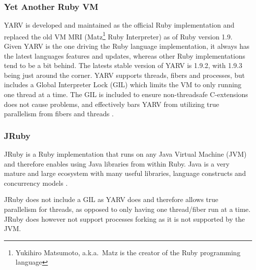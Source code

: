 \subsubsection{Yet Another Ruby VM}
YARV is developed and maintained as the official Ruby implementation and replaced
the old VM MRI (Matz\footnote{Yukihiro Matsumoto, a.k.a.\ Matz is the creator of 
the Ruby programming language} Ruby Interpreter) as of Ruby version 1.9. Given
YARV is the one driving the Ruby language implementation, it always has the
latest languages features and updates, whereas other Ruby implementations tend
to be a bit behind. The latests stable version of YARV is 1.9.2, with 1.9.3
being just around the corner. YARV supports threads, fibers and processes, but
includes a Global Interpreter Lock (GIL) which limits the VM to only running
one thread at a time. The GIL is included to ensure non-threadsafe
C-extensions does not cause problems, and effectively bars YARV from
utilizing true parallelism from fibers and threads \cite{ruby19}.

\subsubsection{JRuby}
JRuby is a Ruby implementation that runs on any Java Virtual Machine (JVM)
and therefore enables using Java libraries from within Ruby. Java is a very
mature and large ecosystem with many useful libraries, language constructs and
concurrency models \cite{usejruby}.

JRuby does not include a GIL as YARV does and therefore allows true
parallelism for threads, as opposed to only having one thread/fiber run
at a time. JRuby does however not support processes forking as it is not
supported by the JVM\@ \cite{jruby}.
